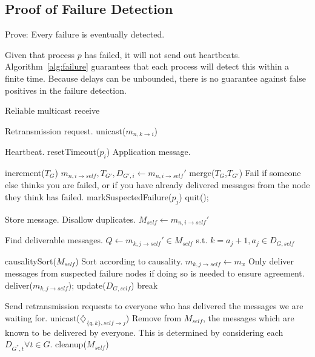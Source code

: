 \documentclass[conference]{IEEEtran}
\begin{document}
\subsection{Proof of Failure Detection}
Prove: Every failure is eventually detected.

Given that process $p$ has failed, it will not send out heartbeats. Algorithm~\ref{alg:failure} guarantees that each process will detect this within a finite time. Because delays can be unbounded, there is no guarantee against false positives in the failure detection.

\begin{algorithm}
\caption{Reliable multicast receive}
\label{alg:rcv}
\begin{algorithmic}[1]
\State \Comment Retransmission request.
	\State unicast($m_{n,k\to i}$)
	\EndIf
\EndProcedure

\State
{} \Comment Heartbeat.
   \State resetTimeout($p_i$)
   \EndProcedure
\State \Comment Application message.

\State increment($T_G$)
\State $m_{n,i \to self}, T_{G'}, D_{G',i} \leftarrow m_{n,i \to self}'$
\State merge($T_G$,$T_{G'}$)
\State \Comment Fail if someone else thinks you are failed, or if you have already delivered messages from the node they think has failed.
	\State markSuspectedFailure($p_j$)
	\State quit();
	\EndIf
\EndFor

\State  \Comment Store message. Disallow duplicates.
\State $M_{self} \leftarrow m_{n,i \to self}'$

\State \Comment Find deliverable messages.
\State $Q \leftarrow m_{k,j \to self}' \in M_{self}$ s.t. $k = a_j+1, a_j \in D_{G,self}$

\State causalitySort($M_{self}$) \Comment Sort according to causality.
		\State $m_{k,j \to self} \leftarrow  m_x$
		\State \Comment Only deliver messages from suspected
						failure nodes if doing so is needed
						to ensure agreement.
		\State deliver($m_{k,j \to self}$);
		\State update($D_{G,self}$) 
		\EndIf
		\State break
	\EndIf
\EndFor

\State \Comment Send retransmission requests to everyone who has delivered the messages we are waiting for.
\State unicast($\diamondsuit_{\{q,k\},self \to j}$)
\EndFor
\EndFor
\State \Comment Remove from $M_{self}$, the messages which are known to be delivered by everyone. This is determined by considering each $D_{G^*,t} \forall t \in G$.
\State cleanup($M_{self}$)
\EndProcedure
\end{algorithmic}
\end{algorithm}
\end{document}
